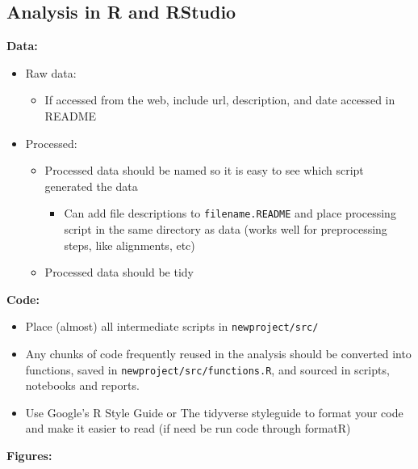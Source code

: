 \documentclass[]{book}
\providecommand{\tightlist}{%
  \setlength{\itemsep}{0pt}\setlength{\parskip}{0pt}}
\begin{document}
\hypertarget{analysis-in-r-and-rstudio}{%
\subsection{Analysis in R and RStudio}\label{analysis-in-r-and-rstudio}}

\textbf{Data:}

\begin{itemize}
\tightlist
\item
  Raw data:

  \begin{itemize}
  \tightlist
  \item
    If accessed from the web, include url, description, and date accessed in README
  \end{itemize}
\item
  Processed:

  \begin{itemize}
  \tightlist
  \item
    Processed data should be named so it is easy to see which script generated the data

    \begin{itemize}
    \tightlist
    \item
      Can add file descriptions to \texttt{filename.README} and place processing script in the same directory as data (works well for preprocessing steps, like alignments, etc)
    \end{itemize}
  \item
    Processed data should be tidy
  \end{itemize}
\end{itemize}

\textbf{Code:}

\begin{itemize}
\tightlist
\item
  Place (almost) all intermediate scripts in \texttt{newproject/src/}
\item
  Any chunks of code frequently reused in the analysis should be converted into functions, saved in \texttt{newproject/src/functions.R}, and sourced in scripts, notebooks and reports.\\
\item
  Use Google's R Style Guide or The tidyverse styleguide to format your code and make it easier to read (if need be run code through formatR)
\end{itemize}

\textbf{Figures:}
\end{document}
